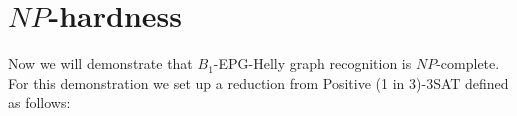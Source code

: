 \documentclass[preprint,12pt]{elsarticle} %
\newtheorem{theorem}{Theorem}
\newtheorem{lema}[theorem]{Lemma}
\begin{document}








\section{$NP$-hardness}\label{sec:sectionDispositivoClausula}

Now we will demonstrate that  $B_1$-EPG-Helly graph recognition is $NP$-complete. For this demonstration we set up a reduction from {\sc Positive (1 in 3)-3SAT} defined  as follows:
\end{document}

